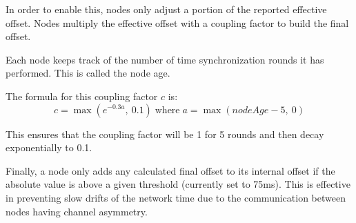 In order to enable this, nodes only adjust a portion of the reported effective offset.
Nodes multiply the effective offset with a coupling factor to build the final offset.

Each node keeps track of the number of time synchronization rounds it has performed.
This is called the node age.

The formula for this coupling factor $c$ is:
$$c = \max\left(e^{-0.3a},\: 0.1\right) \; \text{where} \; a = \max(nodeAge - 5,\: 0)$$

This ensures that the coupling factor will be 1 for 5 rounds and then decay exponentially to 0.1.

\begin{figure}
\end{figure}

Finally, a node only adds any calculated final offset to its internal offset if the absolute value is above a given threshold (currently set to 75ms).
This is effective in preventing slow drifts of the network time due to the communication between nodes having channel asymmetry.
